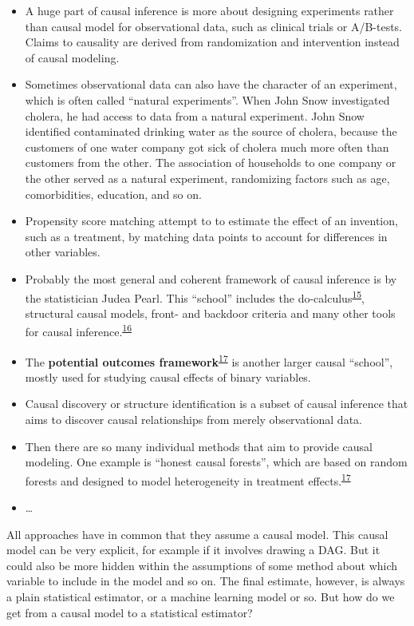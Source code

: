 \documentclass[
  10pt,
]{scrbook}
\providecommand{\tightlist}{%
  \setlength{\itemsep}{0pt}\setlength{\parskip}{0pt}}
\begin{document}
\begin{itemize}
\tightlist
\item
  A huge part of causal inference is more about designing experiments rather than causal model for observational data, such as clinical trials or A/B-tests. Claims to causality are derived from randomization and intervention instead of causal modeling.
\item
  Sometimes observational data can also have the character of an experiment, which is often called ``natural experiments''. When John Snow investigated cholera, he had access to data from a natural experiment. John Snow identified contaminated drinking water as the source of cholera, because the customers of one water company got sick of cholera much more often than customers from the other. The association of households to one company or the other served as a natural experiment, randomizing factors such as age, comorbidities, education, and so on.
\item
  Propensity score matching attempt to to estimate the effect of an invention, such as a treatment, by matching data points to account for differences in other variables.
\item
  Probably the most general and coherent framework of causal inference is by the statistician Judea Pearl. This ``school'' includes the do-calculus\textsuperscript{\protect\hyperlink{ref-pearl2012calculus}{15}}, structural causal models, front- and backdoor criteria and many other tools for causal inference.\textsuperscript{\protect\hyperlink{ref-pearl2009causal}{16}}
\item
  The \textbf{potential outcomes framework}\textsuperscript{\protect\hyperlink{ref-athey2016recursive}{17}} is another larger causal ``school'', mostly used for studying causal effects of binary variables.
\item
  Causal discovery or structure identification is a subset of causal inference that aims to discover causal relationships from merely observational data.
\item
  Then there are so many individual methods that aim to provide causal modeling. One example is ``honest causal forests'', which are based on random forests and designed to model heterogeneity in treatment effects.\textsuperscript{\protect\hyperlink{ref-athey2016recursive}{17}}
\item
  \ldots{}
\end{itemize}

All approaches have in common that they assume a causal model.
This causal model can be very explicit, for example if it involves drawing a DAG.
But it could also be more hidden within the assumptions of some method about which variable to include in the model and so on.
The final estimate, however, is always a plain statistical estimator, or a machine learning model or so.
But how do we get from a causal model to a statistical estimator?
\end{document}
